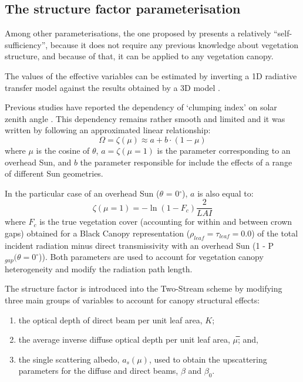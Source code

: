 \documentclass[a4paper,11pt]{report}
\begin{document}
\subsection{The structure factor parameterisation}
Among other parameterisations, the one proposed by \citet{pinty2006} presents a relatively ``self-sufficiency'', because it does not require any previous knowledge about vegetation structure, and because of that, it can be applied to any vegetation canopy. 

The values of the effective variables can be estimated by inverting a 1D radiative transfer model against the results obtained by a 3D model \citep{pinty2006}.

Previous studies have reported the dependency of `clumping index' on solar zenith angle \citep{Andrieu1993,Chen1996,Kucharik1999,Leblanc2005,Ryu2010}. This dependency remains rather smooth and limited \citep{Chen1997a,Chen1997} and it was written by \citet{pinty2006} following an approximated linear relationship:
\begin{equation}
\Omega = \zeta(\mu) \approx a + b \cdot (1 - \mu)
\label{equation:structurefactor}
\end{equation}
\noindent where $\mu$ is the cosine of $\theta$, $a = \zeta(\mu=1)$ is the parameter corresponding to an overhead Sun, and $b$ the parameter responsible for include the effects of a range of different Sun geometries.

In the particular case of an overhead Sun ($\theta$ = 0$^{\circ}$), $a$ is also equal to:
 \begin{equation}
\zeta(\mu=1) = -\ln{(1 - F_c)}\frac{2}{LAI}
\label{equation:structurefactora}
\end{equation}
\noindent where $F_c$ is the true vegetation cover (accounting for within and between crown gaps) obtained for a Black Canopy representation ($\rho_{leaf} = \tau_{leaf} = 0.0$) of the total incident radiation minus direct transmissivity with an overhead Sun (1 - P$_{gap}(\theta = 0^{\circ}$)).
Both parameters are used to account for vegetation canopy heterogeneity and modify the radiation path length. 

The structure factor is introduced into the Two-Stream scheme by modifying three main groups of variables to account for canopy structural effects:

\begin{enumerate}
\item the optical depth of direct beam per unit leaf area, $K$; 
\item the average inverse diffuse optical depth per unit leaf area, $\mu$̅; and, 
\item the single scattering albedo, $a_s(\mu)$, used to obtain the upscattering parameters for the diffuse and direct beams, $\beta$ and $\beta_0$.
\end{enumerate}
\end{document}
